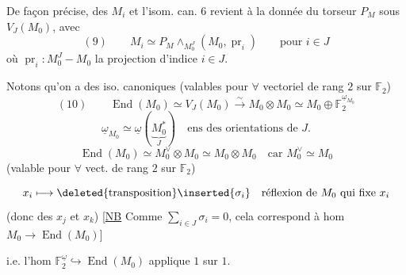 De façon précise,  des  $M_i$ et  l'isom. can. $6$ revient à la donnée du torseur $P_M$ sous $V_J(M_0)$, avec
\[
(9)\qquad M_i\simeq P_M\wedge_{M_0^J}(M_0,\operatorname{pr}_i)
\qquad\text{pour }i\in J
\]
où $\operatorname{pr}_i:M_0^J\mathbin{-}M_0$ la projection d'indice $i\in J$.

Notons qu'on a des iso. canoniques (valables pour $\forall$ vectoriel de rang $2$ sur $\mathbb{F}_2$)
\[
(10)\qquad
\operatorname{End}(M_0)\simeq V_J(M_0)\xrightarrow{\sim}M_0\otimes M_0
\simeq M_0\oplus\mathbb{F}_2^{\underline{\omega}_{M_0}}
\]
\[
\underline{\omega}_{M_0}\simeq\underline{\omega}
(\underbrace{M_0^*}_{J})\quad\text{ens des orientations de }J.
\]
\[
\operatorname{End}(M_0)\simeq M_0^\vee\otimes M_0\simeq M_0\otimes M_0
\quad\text{car }M_0^\vee\simeq M_0
\]
(valable pour $\forall$ vect. de rang $2$ sur $\mathbb{F}_2$)

\[
x_i\longmapsto\deleted{\text{transposition}}\inserted{\sigma_i}
\quad\text{réflexion de $M_0$ qui fixe $x_i$}
\]
(donc  des $x_j$ et $x_k$)
[\uline{NB} Comme $\sum_{i\in J}\sigma_i=0$, cela correspond à hom
$M_0\longrightarrow\operatorname{End}(M_0)$]

i.e. l'hom $\mathbb{F}_2^{\underline{\omega}}\hookrightarrow\operatorname{End}(M_0)$ applique $1$ sur $1$.

